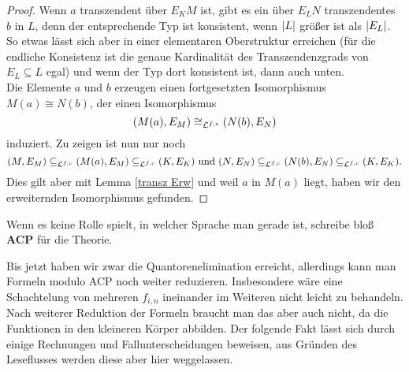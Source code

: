 \begin{proof}
    	Wenn $a$ transzendent über $E_KM$ ist, gibt es ein über $E_LN$ transzendentes $b$ in $L$, denn der entsprechende Typ ist konsistent, wenn ${\left| L \right|}$ größer ist als ${\left| E_L \right|}$. So etwas lässt sich aber in einer elementaren Oberstruktur erreichen (für die endliche Konsistenz ist die genaue Kardinalität des Transzendenzgrads von $E_L\subseteq L$ egal) und wenn der Typ dort konsistent ist, dann auch unten.\\
    	Die Elemente $a$ und $b$ erzeugen einen fortgesetzten Isomorphismus $M(a)\cong N(b)$, der einen Isomorphismus $$(M(a),E_M)\cong_{\mathcal{L}^{f,c}}(N(b),E_N)$$ induziert. Zu zeigen ist nun nur noch $$(M,E_M)\subseteq_{\mathcal{L}^{f,c}}(M(a),E_M)\subseteq_{\mathcal{L}^{f,c}}(K,E_K)\text{ und }(N,E_N)\subseteq_{\mathcal{L}^{f,c}}(N(b),E_N)\subseteq_{\mathcal{L}^{f,c}}(K,E_K).$$
    	Dies gilt aber mit Lemma \ref{transz Erw} und weil $a$ in $M(a)$ liegt, haben wir den erweiternden Isomorphismus gefunden.
    \end{proof}
    
    \newpage
    
    \begin{definition}
    	Wenn es keine Rolle spielt, in welcher Sprache man gerade ist, schreibe bloß \textbf{ACP} für die Theorie.
    \end{definition}
    
    Bis jetzt haben wir zwar die Quantorenelimination erreicht, allerdings kann man Formeln modulo ACP noch weiter reduzieren. Insbesondere wäre eine \glqq{}Schachtelung\grqq{} von mehreren $f_{i,n}$ ineinander im Weiteren nicht leicht zu behandeln. Nach weiterer Reduktion der Formeln braucht man das aber auch nicht, da die Funktionen in den kleineren Körper abbilden. Der folgende Fakt lässt sich durch einige Rechnungen und Fallunterscheidungen beweisen, aus Gründen des Leseflusses werden diese aber hier weggelassen.
    
